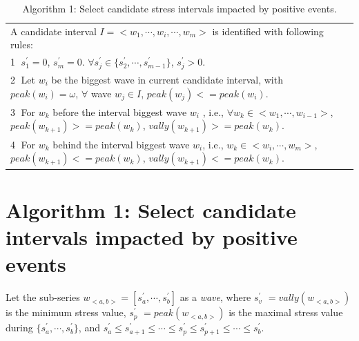 \begin{table}
\begin{center}
\caption{\small{Algorithm 1: Select candidate stress intervals impacted by positive events.}}
\begin{tabular}{l} \hline
A candidate interval $I = <w_1,\cdots, w_i,\cdots, w_m>$ is identified with following rules:\\
\textcircled{1} $s^{'}_1 = 0$, $s^{'}_m = 0$. $\forall s^{'}_j \in \{s^{'}_2,\cdots,s^{'}_{m-1}\}$, $s^{'}_j > 0$.\\
\textcircled{2} Let $w_i$ be the biggest wave in current candidate interval, with $peak(w_i) = \omega$, $\forall $ wave $w_j \in I$, $peak(w_j)<=peak(w_i)$.\\
\textcircled{3} For $w_k$ before the interval biggest wave $w_i$ , i.e., $\forall w_k \in <w_1,\cdots,w_{i-1}>$, $peak(w_{k+1})>=peak(w_k)$, $vally(w_{k+1}) >= peak(w_k)$.\\
\textcircled{4} For $w_k$ behind the interval biggest wave $w_i$, i.e.,  $w_k \in <w_{i}, \cdots, w_m>$, $peak(w_{k+1})<=peak(w_k)$, $vally(w_{k+1}) <= peak(w_k)$.\\\hline
\end{tabular}
\end{center}
\end{table}



\section{Algorithm 1: Select candidate intervals impacted by positive events}
\label{alg:alg1}
Let the sub-series $w_{<a,b>} = [s^{'}_a, \cdots, s^{'}_b]$ as a \emph{wave},
where $s^{'}_v$ $= {vally(w_{<a,b>})}$ is the minimum stress value,
$s^{'}_p$ $= peak(w_{<a,b>})$ is the maximal stress value during $\{s^{'}_a,\cdots,s^{'}_b\}$,
and $s^{'}_a \leq s^{'}_{a+1} \leq \cdots \leq s^{'}_p \leq s^{'}_{p+1} \leq \cdots \leq s^{'}_b$.

